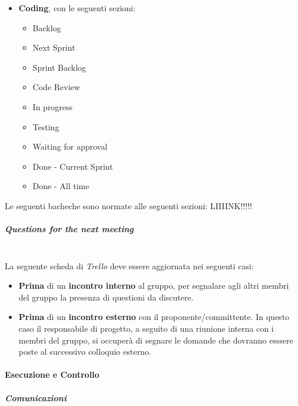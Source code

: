 \begin{itemize}
    \item \textbf{Coding}, con le seguenti sezioni: 
    \begin{itemize}
        \item Backlog
        \item Next Sprint
        \item Sprint Backlog
        \item Code Review
        \item In progress
        \item Testing
        \item Waiting for approval
        \item Done - Current Sprint
        \item Done - All time
    \end{itemize}
\end{itemize}

Le seguenti bacheche sono normate alle seguenti sezioni: LIIIINK!!!!!

\subparagraph{Questions for the next meeting}
\mbox{}\\
\indent La seguente scheda di \textit{Trello} deve essere aggiornata nei seguenti casi:
\begin{itemize}
    \item \textbf{Prima} di un \textbf{incontro interno} al gruppo, per segnalare agli altri membri del gruppo
    la presenza di questioni da discutere.
    \item \textbf{Prima} di un \textbf{incontro esterno} con il proponente/committente. In questo caso il responsabile
    di progetto, a seguito di una riunione interna con i membri del gruppo, si occuperà di segnare le
    domande che dovranno esssere poste al successivo colloquio esterno.
\end{itemize}

\paragraph{Esecuzione e Controllo}

\subparagraph{Comunicazioni}
\mbox{}\\


